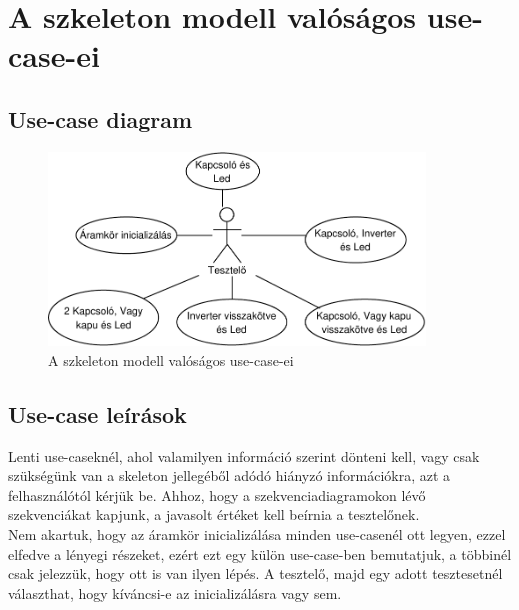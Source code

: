 \section{A szkeleton modell valóságos use-case-ei}

\subsection{Use-case diagram}

\begin{figure}[h]
\begin{center}
\includegraphics[width=10cm]{chapters/chapter05/imgs/usecase.pdf}
\caption{A szkeleton modell valóságos use-case-ei}
\label{fig:SzkeletonUseCase}
\end{center}
\end{figure}

\subsection{Use-case leírások}

Lenti use-caseknél, ahol valamilyen információ szerint dönteni kell, vagy csak szükségünk van a skeleton jellegéből adódó hiányzó információkra, azt a felhasználótól kérjük be. Ahhoz, hogy a szekvenciadiagramokon lévő szekvenciákat kapjunk, a javasolt értéket kell beírnia a tesztelőnek.\\

Nem akartuk, hogy az áramkör inicializálása minden use-casenél ott legyen, ezzel elfedve a lényegi részeket, ezért ezt egy külön use-case-ben bemutatjuk, a többinél csak jelezzük, hogy ott is van ilyen lépés. A tesztelő, majd egy adott tesztesetnél választhat, hogy kíváncsi-e az inicializálásra vagy sem.

